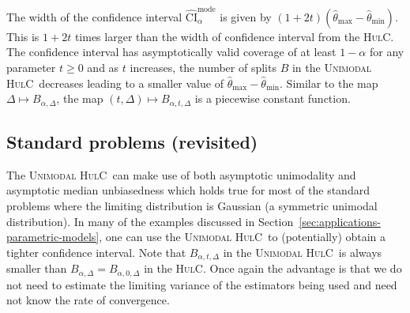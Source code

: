 \documentclass{article}
\newcommand{\hulcnospace}{\textsc{HulC}}
\newcommand{\uhulc}{\textsc{Unimodal HulC}~}
\numberwithin{myalgctr}{section}
\begin{document}
The width of the confidence interval $\widehat{\mathrm{CI}}_{\alpha}^{\mathrm{mode}}$ is given by $(1 + 2t)(\widehat{\theta}_{\max} - \widehat{\theta}_{\min})$. This is $1 + 2t$ times larger than the width of confidence interval from the \hulcnospace. The confidence interval has
{\color{black}asymptotically valid coverage of at least $1-\alpha$}
for any parameter $t \ge 0$ and as $t$ increases, the number of splits $B$ in the \uhulc decreases leading to a smaller value of $\widehat{\theta}_{\max} - \widehat{\theta}_{\min}$. Similar to the map $\Delta \mapsto B_{\alpha,\Delta}$, the map $(t,\Delta)\mapsto B_{\alpha,t,\Delta}$ is a piecewise constant function. 

\subsection{Standard problems (revisited)}
The \uhulc can make use of both asymptotic unimodality and asymptotic median unbiasedness which holds true for most of the standard problems where the limiting distribution is Gaussian (a symmetric unimodal distribution). In many of the examples discussed in Section~\ref{sec:applications-parametric-models}, one can use the \uhulc to (potentially) obtain a tighter confidence interval. Note that $B_{\alpha,t,\Delta}$ in the \uhulc is always smaller than $B_{\alpha,\Delta}=B_{\alpha,0,\Delta}$ in the \hulcnospace. Once again the advantage is that we do not need to estimate the limiting variance of the estimators being used and need not know the rate of convergence.  
\end{document}

